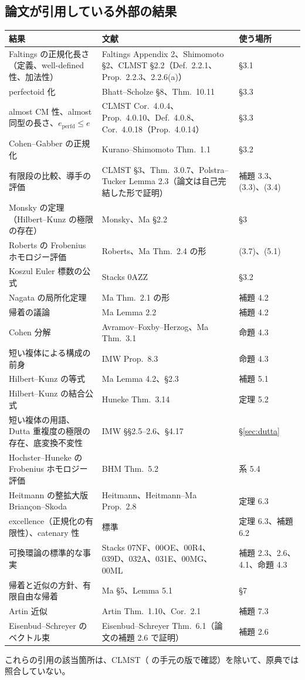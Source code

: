\documentclass[11pt,a4paper]{ltjsarticle}
\theoremstyle{plain}
\theoremstyle{definition}
\newcommand{\ld}[1]{\path{#1}}
\newcommand{\perfd}{\mathrm{perfd}}
\begin{document}
\subsection{論文が引用している外部の結果}
{\small
\begin{longtable}{>{\raggedright}p{4.6cm}>{\raggedright}p{6.2cm}>{\raggedright\arraybackslash}p{3.6cm}}
\toprule
結果 & 文献 & 使う場所 \\
\midrule
\endhead
\bottomrule
\endfoot
Faltings の正規化長さ（定義、well-defined 性、加法性） & Faltings Appendix 2、Shimomoto \S2、CLMST \S2.2（Def.~2.2.1、Prop.~2.2.3、2.2.6(a)） & \S3.1 \\
perfectoid 化 & Bhatt--Scholze \S8、Thm.~10.11 & \S3.3 \\
almost CM 性、almost 同型の長さ、$e_\perfd\le e$ & CLMST Cor.~4.0.4、Prop.~4.0.10、Def.~4.0.8、Cor.~4.0.18（Prop.~4.0.14） & \S3.3 \\
Cohen--Gabber の正規化 & Kurano--Shimomoto Thm.~1.1 & \S3.2 \\
有限段の比較、導手の評価 & CLMST \S3、Thm.~3.0.7、Polstra--Tucker Lemma 2.3（論文は自己完結した形で証明） & 補題 3.3、(3.3)、(3.4) \\
Monsky の定理（Hilbert--Kunz の極限の存在） & Monsky、Ma \S2.2 & \S3 \\
Roberts の Frobenius ホモロジー評価 & Roberts、Ma Thm.~2.4 の形 & (3.7)、(5.1) \\
Koszul Euler 標数の公式 & Stacks 0AZZ & \S3.2 \\
Nagata の局所化定理 & Ma Thm.~2.1 の形 & 補題 4.2 \\
帰着の議論 & Ma Lemma 2.2 & 補題 4.2 \\
Cohen 分解 & Avramov--Foxby--Herzog、Ma Thm.~3.1 & 命題 4.3 \\
短い複体による構成の前身 & IMW Prop.~8.3 & 命題 4.3 \\
Hilbert--Kunz の等式 & Ma Lemma 4.2、\S2.3 & 補題 5.1 \\
Hilbert--Kunz の結合公式 & Huneke Thm.~3.14 & 定理 5.2 \\
短い複体の用語、Dutta 重複度の極限の存在、底変換不変性 & IMW \S\S2.5--2.6、\S4.17 & \S\ref{sec:dutta} \\
Hochster--Huneke の Frobenius ホモロジー評価 & BHM Thm.~5.2 & 系 5.4 \\
Heitmann の整拡大版 Briançon--Skoda & Heitmann、Heitmann--Ma Prop.~2.8 & 定理 6.3 \\
excellence（正規化の有限性）、catenary 性 & 標準 & 定理 6.3、補題 6.2 \\
可換環論の標準的な事実 & Stacks 07NF、00OE、00R4、039D、032A、031E、00MG、00ML & 補題 2.3、2.6、4.1、命題 4.3 \\
帰着と近似の方針、有限自由な帰着 & Ma \S5、Lemma 5.1 & \S7 \\
Artin 近似 & Artin Thm.~1.10、Cor.~2.1 & 補題 7.3 \\
Eisenbud--Schreyer のベクトル束 & Eisenbud--Schreyer Thm.~6.1（論文の補題 2.6 で証明） & 補題 2.6 \\
\end{longtable}
}
これらの引用の該当箇所は、CLMST（\ld{paper/refs/} の手元の版で確認）を除いて、原典では照合していない。
\end{document}
